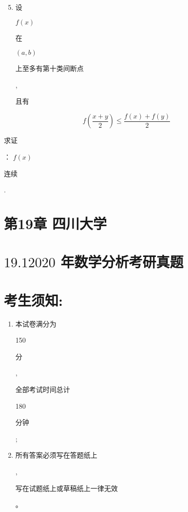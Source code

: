 \documentclass[10pt]{article}
\begin{document}
\begin{enumerate}
  \setcounter{enumi}{4}
  \item \begin{CJK}{UTF8}{mj}设\end{CJK} $f(x)$ \begin{CJK}{UTF8}{mj}在\end{CJK} $(a, b)$ \begin{CJK}{UTF8}{mj}上至多有第十类间断点\end{CJK}, \begin{CJK}{UTF8}{mj}且有\end{CJK}
\end{enumerate}
$$
f\left(\frac{x+y}{2}\right) \leq \frac{f(x)+f(y)}{2}
$$
\begin{CJK}{UTF8}{mj}求证\end{CJK}： $f(x)$ \begin{CJK}{UTF8}{mj}连续\end{CJK}.

\section{第19章 四川大学}
\section{$19.12020$ 年数学分析考研真题}
\section{考生须知:}
\begin{enumerate}
  \item \begin{CJK}{UTF8}{mj}本试卷满分为\end{CJK} 150 \begin{CJK}{UTF8}{mj}分\end{CJK}, \begin{CJK}{UTF8}{mj}全部考试时间总计\end{CJK} 180 \begin{CJK}{UTF8}{mj}分钟\end{CJK};

  \item \begin{CJK}{UTF8}{mj}所有答案必须写在答题纸上\end{CJK}, \begin{CJK}{UTF8}{mj}写在试题纸上或草稿纸上一律无效\end{CJK}。

\end{enumerate}
\end{document}
